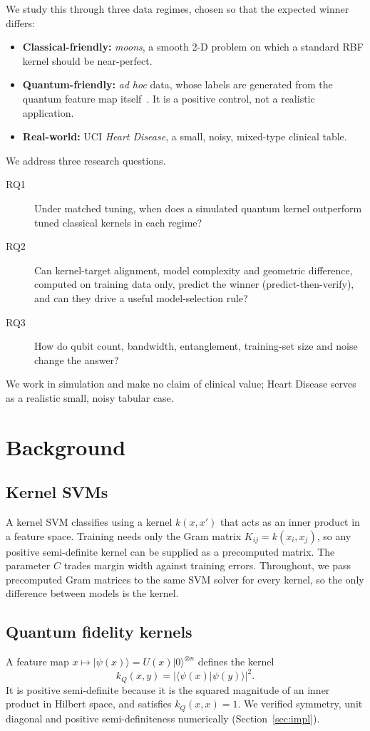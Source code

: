 \documentclass[11pt,a4paper]{article}
\begin{document}
We study this through three data regimes, chosen so that the expected winner differs:
\begin{itemize}
  \item \textbf{Classical-friendly:} \emph{moons}, a smooth 2-D problem on which a standard RBF kernel should be near-perfect.
  \item \textbf{Quantum-friendly:} \emph{ad hoc} data, whose labels are generated from the quantum feature map itself~\cite{havlicek2019}. It is a positive control, not a realistic application.
  \item \textbf{Real-world:} UCI \emph{Heart Disease}, a small, noisy, mixed-type clinical table.
\end{itemize}

We address three research questions.
\begin{description}
  \item[RQ1] Under matched tuning, when does a simulated quantum kernel outperform tuned classical kernels in each regime?
  \item[RQ2] Can kernel-target alignment, model complexity and geometric difference, computed on training data only, predict the winner (predict-then-verify), and can they drive a useful model-selection rule?
  \item[RQ3] How do qubit count, bandwidth, entanglement, training-set size and noise change the answer?
\end{description}
We work in simulation and make no claim of clinical value; Heart Disease serves as a realistic small, noisy tabular case.

\section{Background}
\subsection{Kernel SVMs}
A kernel SVM classifies using a kernel $k(x,x')$ that acts as an inner product in a feature space. Training needs only the Gram matrix $K_{ij}=k(x_i,x_j)$, so any positive semi-definite kernel can be supplied as a precomputed matrix. The parameter $C$ trades margin width against training errors. Throughout, we pass precomputed Gram matrices to the same SVM solver for every kernel, so the only difference between models is the kernel.

\subsection{Quantum fidelity kernels}
A feature map $x\mapsto|\psi(x)\rangle=U(x)|0\rangle^{\otimes n}$ defines the kernel
\begin{equation}
  k_Q(x,y)=\left|\langle\psi(x)|\psi(y)\rangle\right|^2 .
\end{equation}
It is positive semi-definite because it is the squared magnitude of an inner product in Hilbert space, and satisfies $k_Q(x,x)=1$. We verified symmetry, unit diagonal and positive semi-definiteness numerically (Section~\ref{sec:impl}).
\end{document}

